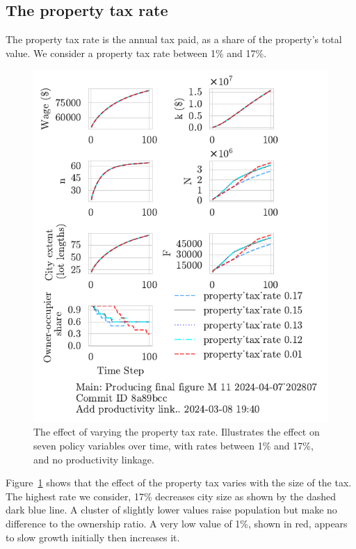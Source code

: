 \newpage



\subsection{The property tax rate}

The property tax rate is the annual tax paid, as a share of the property's total value. We consider a property tax rate between 1\% and 17\%.

\begin{figure}[h!b]
    \centering
    \includegraphics[scale=1.1, trim={0 1.4cm 0 0},clip]{fig/property_tax_with_5_202807.pdf}
    \caption[The effect of varying the property tax rate]{The effect of varying the property tax rate. Illustrates the effect on seven policy variables over time, with rates between 1\% and 17\%, and no productivity linkage.}
    \label{fig:property_tax_ownership_trajectory}
\end{figure}


Figure~\ref{fig:property_tax_ownership_trajectory} shows that the effect of the property tax varies with the size of the tax. The highest rate we consider, 17\%  decreases city size as shown by the dashed dark blue line. A cluster of slightly lower values raise population but make no difference to the ownership ratio. A very low value of 1\%, shown in red, appears to slow growth initially then increases it.  

